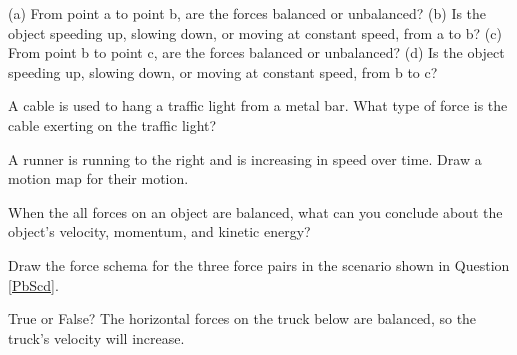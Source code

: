 \documentclass[answers]{exam}
\begin{document}
\begin{questions}
(a) From point a to point b, are the forces balanced or unbalanced? (b) Is the object speeding up, slowing down, or moving at constant speed, from a to b? (c) From point b to point c, are the forces balanced or unbalanced? (d) Is the object speeding up, slowing down, or moving at constant speed, from b to c?

\question %
A cable is used to hang a traffic light from a metal bar. What type of force is the cable exerting on the traffic light?

\question %
A runner is running to the right and is increasing in speed over time. Draw a motion map for their motion. 

\question %
When the all forces on an object are balanced, what can you conclude about the object's velocity, momentum, and kinetic energy?


\question %
Draw the force schema for the three force pairs in the scenario shown in Question \ref{PbScd}.


\question %
True or False? The horizontal forces on the truck below are balanced, so the truck's velocity will increase.

\begin{center}
\end{center}





\end{questions}
\end{document}
